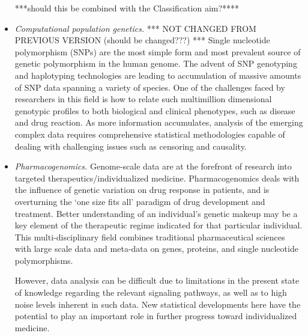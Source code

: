 \documentclass[12pt]{amsart}
\begin{document}
\begin{itemize}

***should this be combined with the Classification aim?****

\item \textit{Computational population genetics.}
*** NOT CHANGED FROM PREVIOUS VERSION (should be changed???) ***
Single nucleotide polymorphism (SNPs) are the most simple form and
most prevalent source of genetic polymorphism in the human genome.
The advent of SNP genotyping and haplotyping technologies are leading
to accumulation of massive amounts of SNP data spanning a variety of
species. One of the challenges faced by researchers in this field is
how to relate such multimillion dimensional genotypic profiles to both
biological and clinical phenotypes,  such as disease and drug
reaction. As more information accumulates, analysis of the emerging
complex data requires comprehensive statistical methodologies capable
of dealing with challenging issues such as censoring and causality.





\item \textit{Pharmacogenomics.}
Genome-scale data are at the forefront of research into 
targeted therapeutics/individualized medicine.
Pharmacogenomics deals with the influence of genetic variation on drug response in patients,
and is overturning the `one size fits all' paradigm of drug development and treatment.
Better understanding of an individual's genetic makeup may be a key 
element of the therapeutic regime indicated for that particular individual.
This multi-disciplinary field combines
traditional pharmaceutical sciences 
with large scale data and meta-data on genes, proteins, 
and single nucleotide polymorphisms.

However, data analysis can be difficult due to limitations in 
the present state of knowledge regarding the relevant 
signaling pathways, as well as to high noise levels inherent in such data. 
New statistical developments here have the potential to play an
important role in further progress toward individualized medicine.





\end{itemize}
\end{document}
